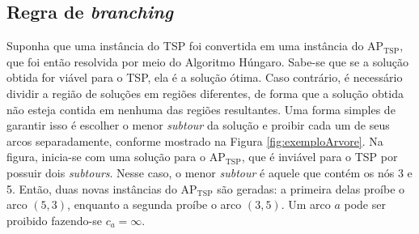 {\subsection{Regra de \textit{branching}}

Suponha que uma instância do TSP foi convertida em uma instância do $\text{AP}_{\text{TSP}}$, que foi então resolvida por meio do Algoritmo Húngaro. Sabe-se que se a solução obtida for viável para o TSP, ela é a solução ótima. Caso contrário, é necessário dividir a região de soluções em regiões diferentes, de forma que a solução obtida não esteja contida em nenhuma das regiões resultantes. Uma forma simples de garantir isso é escolher o menor \textit{subtour} da solução e proibir cada um de seus arcos separadamente, conforme mostrado na Figura \ref{fig:exemploArvore}. Na figura, inicia-se com uma solução para o $\text{AP}_{\text{TSP}}$, que é inviável para o TSP por possuir dois \textit{subtours}. Nesse caso, o menor \textit{subtour} é aquele que contém os nós 3 e 5. Então, duas novas instâncias do $\text{AP}_{\text{TSP}}$ são geradas: a primeira delas proíbe o arco $(5,3)$, enquanto a segunda proíbe o arco $(3,5)$. Um arco $a$ pode ser proibido fazendo-se $c_a = \infty$.

% 
% 

}
